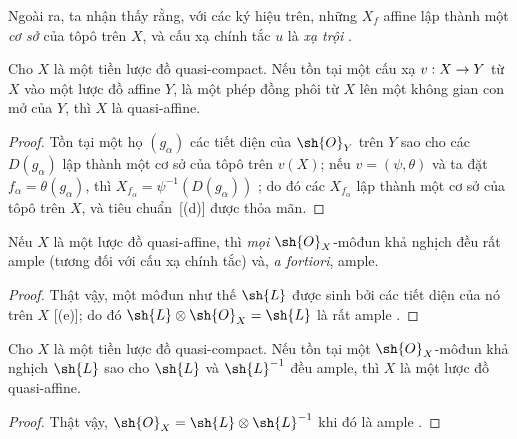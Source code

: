\documentclass[oneside,10pt]{amsart}
\makeatletter
\newcommand{\ega@arrow}[2]{\mathchoice{#1}{#2}{#2}{#2}}
\renewcommand{\to}{\ega@arrow{\longrightarrow}{\rightarrow}}
\let\EGAOriginalLabel\label
\renewcommand{\label}[1]{\phantomsection\EGAOriginalLabel{#1}}
\makeatother
\begin{document}
Ngoài ra, ta nhận thấy rằng, với các ký hiệu trên, những $X_f$ affine lập thành một \emph{cơ sở} của tôpô trên $X$, và cấu xạ chính tắc $u$ là \emph{xạ trội} .

\begin{corollary}[5.1.3]
\label{II.5.1.3}
Cho $X$ là một tiền lược đồ quasi-compact.
Nếu tồn tại một cấu xạ $v:X\to Y$ từ $X$ vào một lược đồ affine $Y$, là một phép đồng phôi từ $X$ lên một không gian con mở của $Y$, thì $X$ là quasi-affine.
\end{corollary}

\begin{proof}
Tồn tại một họ $(g_\alpha)$ các tiết diện của $\sh{O}_Y$ trên $Y$ sao cho các $D(g_\alpha)$ lập thành một cơ sở của tôpô trên $v(X)$;
nếu $v=(\psi,\theta)$ và ta đặt $f_\alpha=\theta(g_\alpha)$, thì $X_{f_\alpha}=\psi^{-1}(D(g_\alpha))$ ; do đó các $X_{f_\alpha}$ lập thành một cơ sở của tôpô trên $X$, và tiêu chuẩn~[(d)] được thỏa mãn.
\end{proof}

\begin{corollary}[5.1.4]
\label{II.5.1.4}
Nếu $X$ là một lược đồ quasi-affine, thì \emph{mọi} $\sh{O}_X$-môđun khả nghịch đều rất ample (tương đối với cấu xạ chính tắc) và, \emph{a fortiori}, ample.
\end{corollary}

\begin{proof}
Thật vậy, một môđun như thế $\sh{L}$ được sinh bởi các tiết diện của nó trên $X$ [(e)]; do đó $\sh{L}\otimes\sh{O}_X=\sh{L}$ là rất ample .
\end{proof}

\begin{corollary}[5.1.5]
\label{II.5.1.5}
Cho $X$ là một tiền lược đồ quasi-compact.
Nếu tồn tại một $\sh{O}_X$-môđun khả nghịch $\sh{L}$ sao cho $\sh{L}$ và $\sh{L}^{-1}$ đều ample, thì $X$ là một lược đồ quasi-affine.
\end{corollary}

\begin{proof}
Thật vậy, $\sh{O}_X=\sh{L}\otimes\sh{L}^{-1}$ khi đó là ample .
\end{proof}
\end{document}
